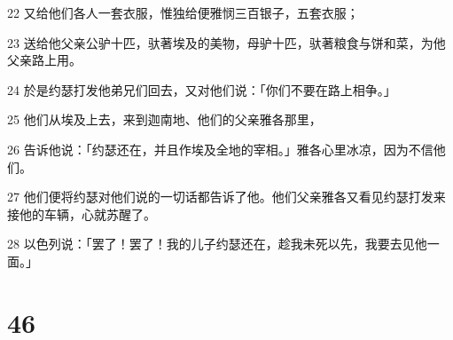 \par 22 又给他们各人一套衣服，惟独给便雅悯三百银子，五套衣服；
\par 23 送给他父亲公驴十匹，驮著埃及的美物，母驴十匹，驮著粮食与饼和菜，为他父亲路上用。
\par 24 於是约瑟打发他弟兄们回去，又对他们说：「你们不要在路上相争。」
\par 25 他们从埃及上去，来到迦南地、他们的父亲雅各那里，
\par 26 告诉他说：「约瑟还在，并且作埃及全地的宰相。」雅各心里冰凉，因为不信他们。
\par 27 他们便将约瑟对他们说的一切话都告诉了他。他们父亲雅各又看见约瑟打发来接他的车辆，心就苏醒了。
\par 28 以色列说：「罢了！罢了！我的儿子约瑟还在，趁我未死以先，我要去见他一面。」

\chapter{46}

